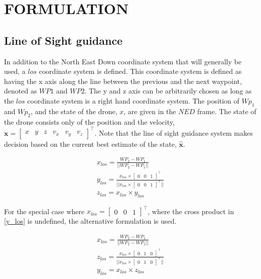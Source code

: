 \section{FORMULATION}
\subsection{Line of Sight guidance}

In addition to the North East Down coordinate system that will generally be used, a $los$ coordinate system is defined. This coordinate system is defined as having the x axis along the line between the previous and the next waypoint, denoted as $WP1$ and $WP2$. The y and z axis can be arbitrarily chosen as long as the $los$ coordinate system is a right hand coordinate system. The position of $Wp_1$ and $Wp_2$, and the state of the drone, $x$, are given in the $NED$ frame. The state of the drone consists only of the position and the velocity, $\textbf{x} = \begin{bmatrix} x & y & z & v_x & v_y & v_z\end{bmatrix}^\top$. Note that the line of sight guidance system makes decision based on the current best estimate of the state, $\mathbf{{\hat{x}}}$.

\begin{align}
    x_{los} = \frac{WP_2 - WP_1}{||WP_2 - WP_1||} \\
    y_{los} = \frac{x_{los} \times \begin{bmatrix} 0&0&1\end{bmatrix}^\top}{|| x_{los} \times \begin{bmatrix} 0&0&1\end{bmatrix}^\top ||}\label{y_los}\\ 
    z_{los} = x_{los} \times y_{los}
\end{align}

For the special case where $x_{los} = \begin{bmatrix} 0&0&1\end{bmatrix}^\top$, where the cross product in \ref{y_los} is undefined, the alternative formulation is used.

\begin{align}
    x_{los} = \frac{WP_2 - WP_1}{||WP_2 - WP_1||} \\
    z_{los} = \frac{x_{los} \times \begin{bmatrix} 0&1&0\end{bmatrix}^\top}{|| x_{los} \times \begin{bmatrix} 0&1&0\end{bmatrix}^\top ||}\label{y_los}\\ 
    y_{los} = x_{los} \times z_{los}
\end{align}

